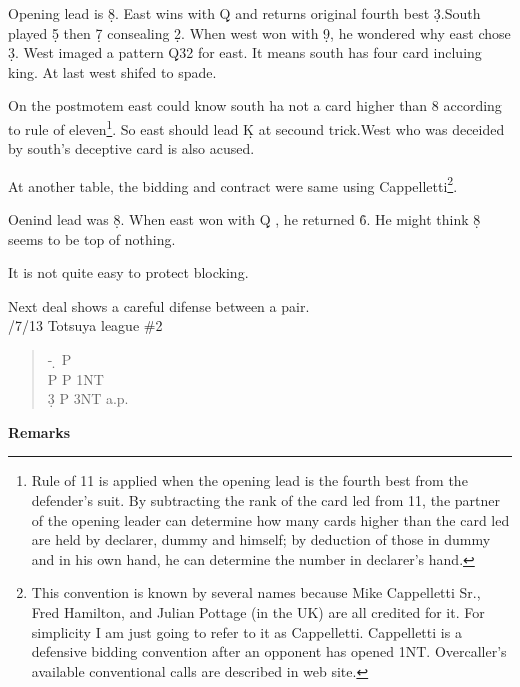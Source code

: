 Opening lead is \d 8. East wins with \d Q and returns original fourth best \d 3.South played \d 5 then \d 7 consealing \d 2. When west won with \d 9, he 
wondered why east chose \d 3. West imaged a pattern \d Q32 for east. It means
south has four card incluing king. At last west shifed to spade.

On the postmotem east could know south ha not a card higher than 8 according
to rule of eleven\footnote{
Rule of 11 is applied when the opening lead is the 
fourth best from the defender's suit.
 By subtracting the rank of the card led from 11, the partner of the opening
 leader can determine how many cards higher than the card led are held by 
declarer, dummy and himself; by deduction of those in dummy and in his own hand, he can determine the number in declarer's hand.}.
So east should lead \d K at secound trick.West who was deceided by south's
deceptive card is also acused.

At another table, the bidding and contract were same using Cappelletti\footnote{This convention is known by several names because Mike Cappelletti Sr., Fred Hamilton, and Julian Pottage (in the UK) are all credited for it. For simplicity I am just going to refer to it as Cappelletti.
Cappelletti is a defensive bidding convention after an opponent has opened 1NT. Overcaller's available conventional calls are described in web site.}.

Oenind lead was \d 8. When east won with \d Q , he returned \h 6. He might
think \d 8 seems to be top of nothing.

It is not quite easy to protect blocking.

\vspace{0.5cm}

Next deal shows a careful difense between a pair.\\

/7/13 Totsuya league \#2
\begin{quote}
%
  {}%
  {}
  {}%
  {}%
\end{quote}
\begin{quote}
\begin{bidding}
- \d  \> P \h \\
P \s \> P \> 1NT\\
3\d \> P \> 3NT \> a.p.
\end{bidding}
\end{quote}
{\bf Remarks}\\


